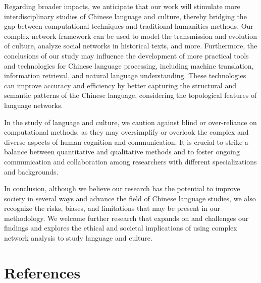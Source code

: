 \documentclass[11pt]{article}
\begin{document}
Regarding broader impacts, we anticipate that our work will stimulate more interdisciplinary studies of Chinese language and culture, thereby bridging the gap between computational techniques and traditional humanities methods. Our complex network framework can be used to model the transmission and evolution of culture, analyze social networks in historical texts, and more. Furthermore, the conclusions of our study may influence the development of more practical tools and technologies for Chinese language processing, including machine translation, information retrieval, and natural language understanding. These technologies can improve accuracy and efficiency by better capturing the structural and semantic patterns of the Chinese language, considering the topological features of language networks.

In the study of language and culture, we caution against blind or over-reliance on computational methods, as they may oversimplify or overlook the complex and diverse aspects of human cognition and communication. It is crucial to strike a balance between quantitative and qualitative methods and to foster ongoing communication and collaboration among researchers with different specializations and backgrounds.

In conclusion, although we believe our research has the potential to improve society in several ways and advance the field of Chinese language studies, we also recognize the risks, biases, and limitations that may be present in our methodology. We welcome further research that expands on and challenges our findings and explores the ethical and societal implications of using complex network analysis to study language and culture.
\section*{References}

\end{document}
